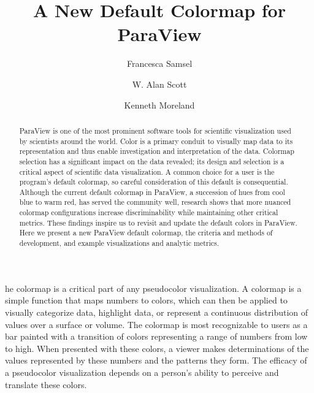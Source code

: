 \documentclass{IEEEcsmag}
\begin{document}

\title{A New Default Colormap for ParaView}

\author{Francesca Samsel}

\author{W. Alan Scott}

\author{Kenneth Moreland}




\begin{abstract}
ParaView is one of the most prominent software tools for scientific visualization used by scientists around the world.
Color is a primary conduit to visually map data to its representation and thus enable investigation and interpretation of the data.
Colormap selection has a significant impact on the data revealed; its design and selection is a critical aspect of scientific data visualization.
A common choice for a user is the program's default colormap, so careful consideration of this default is consequential.
Although the current default colormap in ParaView, a succession of hues from cool blue to warm red, has served the community well, research shows that more nuanced colormap configurations increase discriminability while maintaining other critical metrics.
These findings inspire us to revisit and update the default colors in ParaView.
Here we present a new ParaView default colormap, the criteria and methods of development, and example visualizations and analytic metrics.
\end{abstract}

\maketitle

he colormap is a critical part of any pseudocolor visualization.
A colormap is a simple function that maps numbers to colors, which can then be applied to visually categorize data, highlight data, or represent a continuous distribution of values over a surface or volume.
The colormap is most recognizable to users as a bar painted with a transition of colors representing a range of numbers from low to high.
When presented with these colors, a viewer makes determinations of the values represented by these numbers and the patterns they form.
The efficacy of a pseudocolor visualization depends on a person's ability to perceive and translate these colors.
\end{document}
